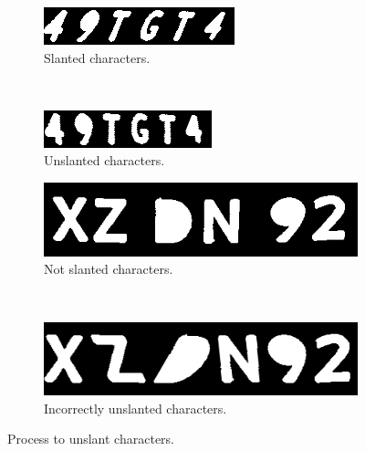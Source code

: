 \begin{figure}[ht]
        \centering
        \begin{subfigure}{0.33\textwidth}
            \includegraphics[width=\textwidth]{plaatjes/slanted-plate}
            \caption{Slanted characters.}
            \label{fig:slanted-plate}
        \end{subfigure}%
        ~ 
        \begin{subfigure}{0.33\textwidth}
            \includegraphics[width=\textwidth]{plaatjes/unslanted-plate}
            \caption{Unslanted characters.}
            \label{fig:unslanted-plate}
        \end{subfigure}%

        \begin{subfigure}{0.33\textwidth}
            \includegraphics[width=\textwidth]{plaatjes/plate-no-slant}
            \caption{Not slanted characters.}
            \label{fig:not-slanted-plate}
        \end{subfigure}%
        ~ 
        \begin{subfigure}{0.33\textwidth}
            \includegraphics[width=\textwidth]{plaatjes/unslanted-incorrectly}
            \caption{Incorrectly unslanted characters.}
            \label{fig:incorrectly-unslanted-plate}
        \end{subfigure}%

        \caption{Process to unslant characters.}
        \label{fig:unslanting-plate}
\end{figure}

